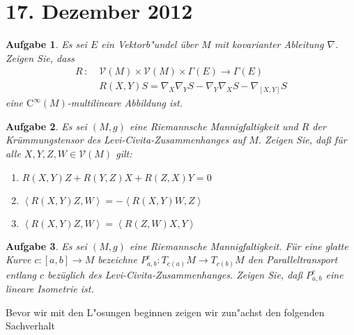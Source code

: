 \documentclass[paper=A4, twoside, chapterprefix=true, bibliography=totoc, headsepline]{scrbook}
\theoremstyle{plain}
\theoremstyle{nonumberplain}
\theoremstyle{empty}
\theoremstyle{break}
\newtheorem{Aufg}{Aufgabe}
\begin{document}
\section{17. Dezember 2012}
\setcounter{Aufg}{0} %
\setcounter{Loes}{0}

\begin{Aufg}
Es sei $E$ ein Vektorb"undel über $M$ mit kovarianter Ableitung $\nabla$.
Zeigen Sie, dass
\begin{align*}
	R \, : \; &\mathcal{V} (M) \times \mathcal{V} (M) \times \Gamma (E) \longrightarrow \Gamma (E) \\[1ex]
	& R(X,Y)S = \nabla_X \nabla_Y S - \nabla_Y \nabla_X S - \nabla_{[X,Y]} S
\end{align*}
eine $\mathrm{C}^{\infty} (M)$-multilineare Abbildung ist.
\end{Aufg}

\begin{Aufg}
Es sei $(M,g)$ eine Riemannsche Mannigfaltigkeit und $R$ der Krümmungstensor des Levi-Civita-Zusammenhanges auf $M$.
Zeigen Sie, daß für alle $X,Y,Z,W \in \mathcal{V} (M)$ gilt:
\begin{enumerate}[label=\alph*),leftmargin=*,widest=b]
\item
	$R(X,Y)Z + R(Y,Z)X + R(Z,X)Y = 0$
\item
	$\left\langle R(X,Y)Z,W \right\rangle = - \left\langle R(X,Y)W,Z \right\rangle$
\item
	$\left\langle R(X,Y)Z,W \right\rangle = \left\langle R(Z,W)X,Y \right\rangle$
\end{enumerate}\end{Aufg}

\begin{Aufg}
Es sei $(M,g)$ eine Riemannsche Mannigfaltigkeit.
Für eine glatte Kurve $c : [a,b] \rightarrow M$ bezeichne $P^c_{a,b} : T_{c(a)} M \rightarrow T_{c(b)} M$ den Paralleltransport entlang $c$ bezüglich des Levi-Civita-Zusammenhanges.
Zeigen Sie, daß $P^c_{a,b}$ eine lineare Isometrie ist.
\end{Aufg}

Bevor wir mit den L"osungen beginnen zeigen wir zun"achst den folgenden Sachverhalt
\end{document}
